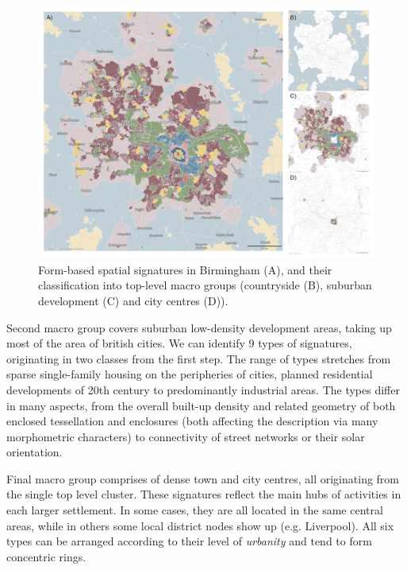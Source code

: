 \begin{figure}
    \includegraphics[width=0.75\linewidth, center]{fig/bham.png}
    \caption{Form-based spatial signatures in Birmingham (A), and their classification
    into top-level macro groups (countryside (B), suburban development (C) and city
    centres (D)).}
    \label{fig:bham}
\end{figure}

Second macro group covers suburban low-density development areas, taking up most of the
area of british cities. We can identify 9 types of signatures, originating in two
classes from the first step. The range of types stretches from sparse single-family
housing on the peripheries of cities, planned residential developments of 20th century
to predominantly industrial areas. The types differ in many aspects, from the overall
built-up density and related geometry of both enclosed tessellation and enclosures (both
affecting the description via many morphometric characters) to connectivity of street
networks or their solar orientation.


Final macro group comprises of dense town and city centres, all originating from the
single top level cluster. These signatures reflect the main hubs of activities in each
larger settlement. In some cases, they are all located in the same central areas, while
in others some local district nodes show up (e.g. Liverpool). All six types can be
arranged according to their level of \textit{urbanity} and tend to form concentric
rings.


